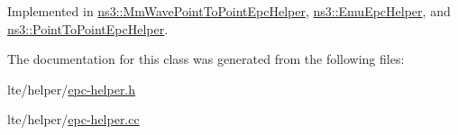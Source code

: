 Implemented in \hyperlink{classns3_1_1MmWavePointToPointEpcHelper_afefac14ad79ff059b052305013d2beb3}{ns3\+::\+Mm\+Wave\+Point\+To\+Point\+Epc\+Helper}, \hyperlink{classns3_1_1EmuEpcHelper_a3bd27e33922c8053bff248c7a89f3404}{ns3\+::\+Emu\+Epc\+Helper}, and \hyperlink{classns3_1_1PointToPointEpcHelper_a9160d83b92d5ea373abcd627f5d784f5}{ns3\+::\+Point\+To\+Point\+Epc\+Helper}.



The documentation for this class was generated from the following files\+:\begin{DoxyCompactItemize}
\item 
lte/helper/\hyperlink{epc-helper_8h}{epc-\/helper.\+h}\item 
lte/helper/\hyperlink{epc-helper_8cc}{epc-\/helper.\+cc}\end{DoxyCompactItemize}
